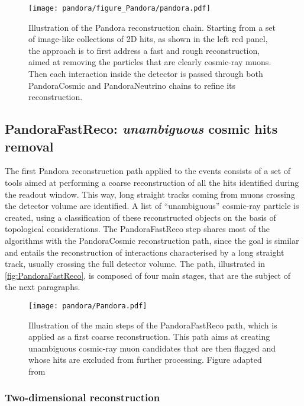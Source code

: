 \begin{sidewaysfigure}
    \centering
    \texttt{[image: pandora/figure\_Pandora/pandora.pdf]}
    \caption[Overview of the Pandora reconstruction chain]{Illustration of the Pandora reconstruction chain. Starting from a set of image-like collections of 2D hits, as shown in the left red panel, the approach is to first address a fast and rough reconstruction, aimed at removing the particles that are clearly cosmic-ray muons. Then each interaction inside the detector is passed through both PandoraCosmic and PandoraNeutrino chains to refine its reconstruction. }
    \label{fig:pandora}
\end{sidewaysfigure}

\subsection{PandoraFastReco: \emph{unambiguous} cosmic hits removal} \label{sec:fast_reco}

The first Pandora reconstruction path applied to the events consists of a set of tools aimed at performing a coarse reconstruction of all the hits identified during the readout window. This way, long straight tracks coming from muons crossing the detector volume are identified. A list of ``unambiguous'' cosmic-ray particle is created, using a classification of these reconstructed objects on the basis of topological considerations. The PandoraFastReco step shares most of the algorithms with the PandoraCosmic reconstruction path, since the goal is similar and entails the reconstruction of interactions characterised by a long straight track, usually crossing the full detector volume. The path, illustrated in \autoref{fig:PandoraFastReco}, is composed of four main stages, that are the subject of the next paragraphs. 

\begin{figure}
    \centering
    \texttt{[image: pandora/Pandora.pdf]}
    \caption[PandoraFastReco path illustration]{Illustration of the main steps of the PandoraFastReco path, which is applied as a first coarse reconstruction. This path aims at creating unambiguous cosmic-ray muon candidates that are then flagged and whose hits are excluded from further processing. Figure adapted from \cite{MicroBooNE:2017xvs}}
    \label{fig:PandoraFastReco}
\end{figure}

\subsubsection{Two-dimensional reconstruction}

